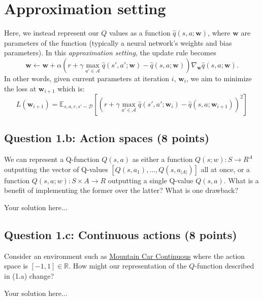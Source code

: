 \documentclass[12pt]{article}
\begin{document}
\section*{Approximation setting}
Here, we instead represent our $Q$ values as a function $\hat{q}(s,a;\mathbf{w})$, where $\mathbf{w}$ are parameters of the function (typically a neural network's weights and bias parameters). In this \textit{approximation setting}, the update rule becomes
\begin{equation}
\mathbf{w} \leftarrow \mathbf{w} + \alpha \left( r + \gamma \max_{a' \in \mathcal{A}} \hat{q}(s',a';\mathbf{w}) - \hat{q}(s,a;\mathbf{w}) \right) \nabla_{\mathbf{w}}\hat{q}(s,a;\mathbf{w}).
\end{equation}
In other words, given current parameters at iteration $i$, $\mathbf{w}_i$, we aim to minimize the loss at $\mathbf{w}_{i+1}$ which is:
\begin{equation}
L(\mathbf{w}_{i+1}) = \mathbb{E}_{s,a,r,s' \sim \mathcal{D}} \left[ \left( r + \gamma \max_{a' \in \mathcal{A}} \hat{q}(s',a';\mathbf{w}_{i}) - \hat{q}(s,a;\mathbf{w}_{i+1}) \right)^2 \right]
\end{equation}

\subsection*{Question 1.b: Action spaces (8 points)}
We can represent a Q-function $Q(s, a)$ as either a function $Q(s; w): S \rightarrow R^A$ outputting the vector of Q-values $[Q(s, a_1), …, Q(s, a_{|A|})]$ all at once, or a function $Q(s, a; w): S \times A \rightarrow R$ outputting a single Q-value $Q(s, a)$. What is a benefit of implementing the former over the latter? What is one drawback?
\begin{solution}
Your solution here...
\end{solution}

\subsection*{Question 1.c: Continuous actions (8 points)}
Consider an environment such as \href{https://www.gymlibrary.dev/environments/classic_control/mountain_car_continuous/}{Mountain Car Continuous} where the action space is $[-1,1] \in \mathbb{R}$. How might our representation of the $Q$-function described in (1.a) change?
\begin{solution}
Your solution here...
\end{solution}
\end{document}
